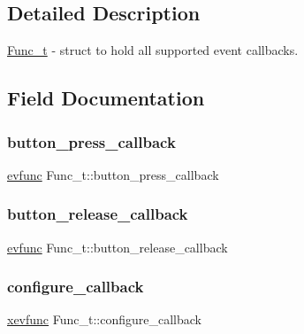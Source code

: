\subsection{Detailed Description}
\hyperlink{structFunc__t}{Func\+\_\+t} -\/ struct to hold all supported event callbacks. 

\subsection{Field Documentation}
\mbox{\label{structFunc__t_aa58bc35a1499d8cd850d2a083ad016f1}} 
\subsubsection{\texorpdfstring{button\+\_\+press\+\_\+callback}{button\_press\_callback}}
{\footnotesize\ttfamily \hyperlink{xwidget_8h_ab4ae973f86a383c8c0f92b709044520a}{evfunc} Func\+\_\+t\+::button\+\_\+press\+\_\+callback}

\mbox{\label{structFunc__t_a8cb9d8135a178027675c96599ff8312e}} 
\subsubsection{\texorpdfstring{button\+\_\+release\+\_\+callback}{button\_release\_callback}}
{\footnotesize\ttfamily \hyperlink{xwidget_8h_ab4ae973f86a383c8c0f92b709044520a}{evfunc} Func\+\_\+t\+::button\+\_\+release\+\_\+callback}

\mbox{\label{structFunc__t_a7876670d3bb74b11ab93fe81908d04b0}} 
\subsubsection{\texorpdfstring{configure\+\_\+callback}{configure\_callback}}
{\footnotesize\ttfamily \hyperlink{xwidget_8h_a9ef0263424a7f5f8f6b02055fca67ddd}{xevfunc} Func\+\_\+t\+::configure\+\_\+callback}

